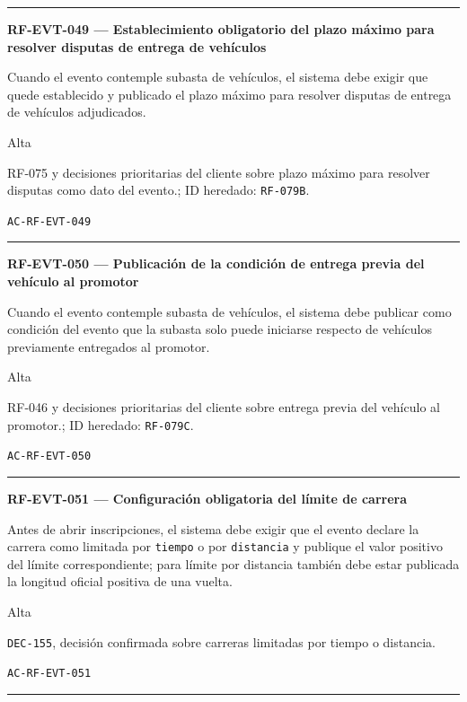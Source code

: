 \documentclass[10pt,letterpaper]{article}
\begin{document}
\vspace{0.25em}\hrule\vspace{0.65em}
\noindent\textbf{RF-EVT-049 --- Establecimiento obligatorio del plazo máximo para resolver disputas de entrega de vehículos}\par
\begin{description}[style=nextline,leftmargin=3.15cm,labelwidth=2.8cm,font=\normalfont\bfseries]
\item[Obligación] Cuando el evento contemple subasta de vehículos, el sistema debe exigir que quede establecido y publicado el plazo máximo para resolver disputas de entrega de vehículos adjudicados.
\item[Prioridad] Alta
\item[Procedencia] RF-075 y decisiones prioritarias del cliente sobre plazo máximo para resolver disputas como dato del evento.; ID heredado: \texttt{RF-079B}.
\item[Verificación] \texttt{AC-RF-EVT-049}
\end{description}
\vspace{0.25em}\hrule\vspace{0.65em}
\noindent\textbf{RF-EVT-050 --- Publicación de la condición de entrega previa del vehículo al promotor}\par
\begin{description}[style=nextline,leftmargin=3.15cm,labelwidth=2.8cm,font=\normalfont\bfseries]
\item[Obligación] Cuando el evento contemple subasta de vehículos, el sistema debe publicar como condición del evento que la subasta solo puede iniciarse respecto de vehículos previamente entregados al promotor.
\item[Prioridad] Alta
\item[Procedencia] RF-046 y decisiones prioritarias del cliente sobre entrega previa del vehículo al promotor.; ID heredado: \texttt{RF-079C}.
\item[Verificación] \texttt{AC-RF-EVT-050}
\end{description}
\vspace{0.25em}\hrule\vspace{0.65em}
\noindent\textbf{RF-EVT-051 --- Configuración obligatoria del límite de carrera}\par
\begin{description}[style=nextline,leftmargin=3.15cm,labelwidth=2.8cm,font=\normalfont\bfseries]
\item[Obligación] Antes de abrir inscripciones, el sistema debe exigir que el evento declare la carrera como limitada por \texttt{tiempo} o por \texttt{distancia} y publique el valor positivo del límite correspondiente; para límite por distancia también debe estar publicada la longitud oficial positiva de una vuelta.
\item[Prioridad] Alta
\item[Procedencia] \texttt{DEC-155}, decisión confirmada sobre carreras limitadas por tiempo o distancia.
\item[Verificación] \texttt{AC-RF-EVT-051}
\end{description}
\vspace{0.25em}\hrule\vspace{0.65em}
\end{document}
